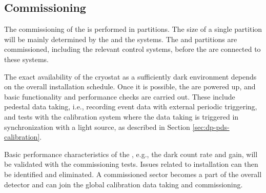 \subsection{Commissioning}
\label{subsec:dp-pds-commissioning}

The commissioning of the  is performed in partitions. The size of a single partition will be mainly determined by the  and the  systems. The  and  partitions are commissioned, including the relevant control systems, before the  are connected to these systems.

The exact availability of the cryostat as a sufficiently dark environment depends on the overall installation schedule. Once it is possible, the  are powered up, and basic functionality and performance checks are carried out. These include pedestal data taking, i.e., recording event data with external periodic triggering, and tests with the calibration system where the data taking is triggered in synchronization with a light source, as described in Section \ref{sec:dp-pds-calibration}.

Basic performance characteristics of the , e.g., the dark count rate and gain, will be validated with the commissioning tests. Issues related to installation can then be identified and eliminated. A commissioned sector becomes a part of the overall detector and can join the global calibration data taking and commissioning.


